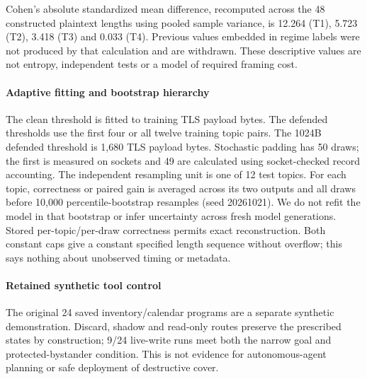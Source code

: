 Cohen's absolute standardized mean difference, recomputed across the 48 constructed plaintext lengths using pooled sample variance, is 12.264 (T1), 5.723 (T2), 3.418 (T3) and 0.033 (T4). Previous values embedded in regime labels were not produced by that calculation and are withdrawn. These descriptive values are not entropy, independent tests or a model of required framing cost.

\paragraph{Adaptive fitting and bootstrap hierarchy}
The clean threshold is fitted to training TLS payload bytes. The defended thresholds use the first four or all twelve training topic pairs. The 1024B defended threshold is 1,680 TLS payload bytes. Stochastic padding has 50 draws; the first is measured on sockets and 49 are calculated using socket-checked record accounting. The independent resampling unit is one of 12 test topics. For each topic, correctness or paired gain is averaged across its two outputs and all draws before 10,000 percentile-bootstrap resamples (seed 20261021). We do not refit the model in that bootstrap or infer uncertainty across fresh model generations. Stored per-topic/per-draw correctness permits exact reconstruction. Both constant caps give a constant specified length sequence without overflow; this says nothing about unobserved timing or metadata.

\paragraph{Retained synthetic tool control}
The original 24 saved inventory/calendar programs are a separate synthetic demonstration. Discard, shadow and read-only routes preserve the prescribed states by construction; 9/24 live-write runs meet both the narrow goal and protected-bystander condition. This is not evidence for autonomous-agent planning or safe deployment of destructive cover.


